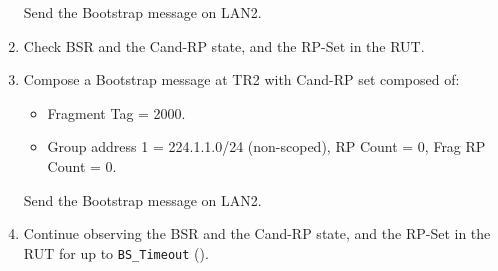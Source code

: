 \documentclass[11pt]{report}
\begin{document}
\begin{enumerate}
\begin{itemize}
  \end{itemize}

  Send the Bootstrap message on LAN2.

  \item Check BSR and the Cand-RP state, and the RP-Set in the RUT.

  \item Compose a Bootstrap message at TR2 with Cand-RP set composed of:

  \begin{itemize}

    \item Fragment Tag = 2000.

    \item Group address 1 = 224.1.1.0/24 (non-scoped),
    RP Count = 0, Frag RP Count = 0.

  \end{itemize}

  Send the Bootstrap message on LAN2.

  \item Continue observing the BSR and the Cand-RP state, and the RP-Set in
  the RUT for up to \verb=BS_Timeout= ({\PimsmBSTimeout}).

\end{enumerate}


\end{document}
